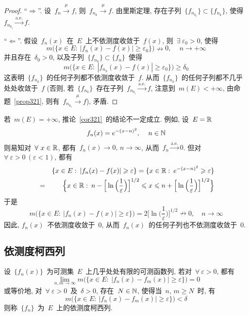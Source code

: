 \begin{proof}
``$\Rightarrow$''. 设~$f_n \xrightarrow{~\mu~} f$, 则~$f_{n_k} \xrightarrow{~\mu~} f$. 由里斯定理, 存在子列~$\{f_{n_{k_i}}\} \subset \{f_{n_k}\}$, 使得~$f_{n_{k_i}} \xrightarrow{\mathrm{a.e.}} f$.

``$\Leftarrow$''. 假设~$f_n(x)$~在~$E$~上不依测度收敛于~$f(x)$, 则~$\exists~ \varepsilon_0 > 0$, 使得
\[
m\big( \{ x \in E: \: |f_n(x) - f(x)| \geqslant \varepsilon_0\} \big) \nrightarrow 0, \, \quad n \to +\infty
\]
并且存在~$\delta_0 > 0$, 以及子列~$\{f_{n_k}\} \subset \{f_n\}$~使得
\[
m\big( \{ x \in E: \: |f_{n_k}(x) - f(x)| \geqslant \varepsilon_0\} \big) \geqslant \delta_0
\]
这表明~$\{f_{n_k}\}$~的任何子列都不依测度收敛于~$f$. 从而~$\{f_{n_k}\}$~的任何子列都不几乎处处收敛于~$f$  (否则, 若~$\{f_{n_k}\}$~存在子列~$f_{n_{k_i}} \xrightarrow{\mathrm{a.e.}} f$, 注意到~$m(E) < + \infty$,  由命题~\ref{prop321}, 则有~$f_{n_{k_i}} \xrightarrow{~\mu~} f$), 矛盾.
\end{proof}

\begin{remark}
若~$m(E) = + \infty$, 推论~\ref{cor321}~的结论不一定成立. 例如, 设~$E = \mathbb{R}$
\[
f_n(x) = e^{-(x-n)^2}, \, \quad n \in \mathbb{N}
\]
则易知对~$\forall~x \in \mathbb{R}$, 都有~$f_n(x) \to 0, \, n \to \infty$, 从而~$f_n \xrightarrow{\mathrm{a.e.}} 0$. 但对~$\forall~\varepsilon >0 ~ (\varepsilon < 1)$, 都有
\begin{eqnarray*}
&&\{x \in E: \: |f_n(x) - f(x)| \geqslant \varepsilon \} = \{x \in \mathbb{R}: \: e^{-(x-n)^2} \geqslant \varepsilon \} \\
&=& \Big\{ x \in \mathbb{R}: \: n - \Big[ \ln \Big(\frac{1}{\varepsilon} \Big) \Big]^{1/2} \leqslant x \leqslant n + \Big[ \ln \Big(\frac{1}{\varepsilon} \Big) \Big]^{1/2} \Big\}
\end{eqnarray*}
于是
\[
m\big(\{x \in E: \: |f_n(x) - f(x)| \geqslant \varepsilon \}\big) = 2 \Big[ \ln \Big(\frac{1}{\varepsilon} \Big) \Big]^{1/2} \nrightarrow 0, \quad n \to \infty
\]
因此, $f_n(x)$~不依测度收敛于~$0$, 从而~$f_n(x)$~的任何子列也不依测度收敛于~$0$.
\end{remark}

\subsection{依测度柯西列}

\begin{definition}
设~$\{f_n(x)\}$~为可测集~$E$~上几乎处处有限的可测函数列, 若对~$\forall~\varepsilon > 0$, 都有
\[
\lim_{n,m \to \infty} m\big( \{x \in E: \: |f_n(x) - f_m(x)| \geqslant \varepsilon \}\big) = 0
\]
或等价地, 对~$\forall~\varepsilon > 0$~及~$\delta > 0$, 存在~$N \in \mathbb{N}$, 使得当~$n,\,m \geqslant N$~时, 有
\[
m\big( \{x \in E: \: |f_n(x) - f_m(x)| \geqslant \varepsilon \}\big) < \delta
\]
则称~$\{f_n\}$~为~$E$~上的依测度柯西列.
\end{definition}


